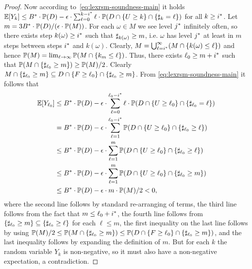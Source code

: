 \begin{proof}
Now according to~\eqref{eq:lexrsm-soundness-main} it holds  $\mathbb{E}[Y_k]\leq {B}^*\cdot \mathbb{P}(D) - \epsilon\cdot\sum_{\ell=0}^{k-{i}^*} \ell\cdot\mathbb{P}(D 
\cap \{U\geq k\} \cap \{\sharp_k 
= 
\ell\})$ for all $k\geq {i}^*$. Let $m=3{B}^*\cdot \mathbb{P}(D)/(\epsilon\cdot \mathbb{P}(M))$. For each $\omega\in M$ we see level ${j}^*$ infinitely often, so there exists step $k(\omega)\geq {i}^*$ such that $\sharp_{k(\omega)}\geq m$, i.e. $\omega$ has level ${j}^* $ at least in $m$ steps between steps ${i}^*$ and $k(\omega)$. Clearly, $M = \bigcup_{\ell={i}^*}^{\infty} (M \cap \{k(\omega) \leq \ell\})$ and hence $\mathbb{P}(M)=\lim_{\ell\rightarrow \infty}\mathbb{P}(M \cap \{k_{m} \leq \ell\})$. Thus, there exists $\ell_0 \geq m+{i}^*$ such that $\mathbb{P}(M \cap \{\sharp_{\ell_0}\geq m\}) \geq \mathbb{P}(M)/2$. Clearly $M \cap \{\sharp_{\ell_0}\geq m\} \subseteq D\cap \{F\geq \ell_0 \} \cap \{\sharp_{\ell_0}\geq m \}$. From \eqref{eq:lexrsm-soundness-main} it follows that
\begin{align*}
\mathbb{E}[Y_{\ell_0}]&\leq {B}^*\cdot \mathbb{P}(D) - \epsilon\cdot\sum_{\ell=0}^{\ell_0-{i}^*} \ell\cdot\mathbb{P}(D 
\cap \{U\geq \ell_0\} \cap \{\sharp_{\ell_0} 
=
\ell\}) \\
&= {B}^*\cdot \mathbb{P}(D) - \epsilon\cdot \sum_{\ell=1}^{\ell_0-{i}^*} \mathbb{P}(D 
\cap \{U\geq \ell_0\} \cap \{\sharp_{\ell_0} 
\geq 
\ell\})\\
& \leq {B}^*\cdot \mathbb{P}(D) - \epsilon\cdot \sum_{\ell=1}^{m} \mathbb{P}(D 
\cap \{U\geq \ell_0\} \cap \{\sharp_{\ell_0} 
\geq 
\ell\}) \\&\leq {B}^*\cdot \mathbb{P}(D) - \epsilon\cdot \sum_{\ell=1}^{m} \mathbb{P}(D 
\cap \{U\geq \ell_0\} \cap \{\sharp_{\ell_0} 
\geq 
m\})\\
&\leq {B}^*\cdot \mathbb{P}(D) - \epsilon\cdot m \cdot \mathbb{P}(M)/2 < 0, 
\end{align*}where the second line follows by standard re-arranging of terms, the third line follows from the fact that $m\leq \ell_0 + {i}^*$, the fourth line follows from $\{\sharp_{\ell_0} 
\geq 
m \} \subseteq\{ \sharp_{\ell_0} 
\geq 
\ell\}$ for each $\ell \leq m$, the first inequality on the last line follows 
by  using $\mathbb{P}(M)/2\leq \mathbb{P}(M \cap \{\sharp_{\ell_0}\geq m\}) \leq 
\mathbb{P}(D\cap \{F\geq \ell_0 \} \cap \{\sharp_{\ell_0}\geq m \})$, and
the last inequality follows by expanding the definition of $m$. But for each $k$ the random variable $Y_k$ is non-negative, so it must also have a non-negative expectation, a contradiction.


	


% 
\end{proof}


